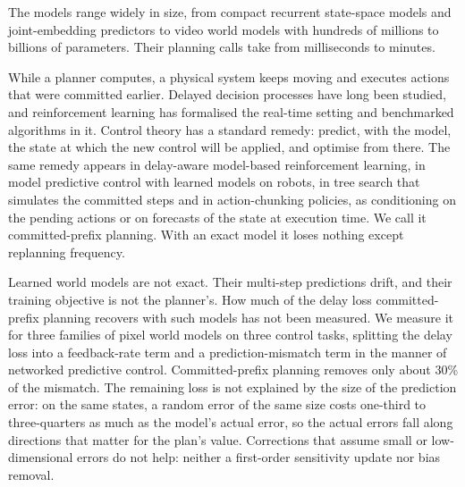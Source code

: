 \documentclass[pdflatex,sn-nature]{sn-jnl}%
\begin{document}
The models range widely in size, from compact recurrent state-space models\cite{hafner2019planet} and joint-embedding predictors\cite{maes2026lewm,zhou2024dinowm} to video world models with hundreds of millions to billions of parameters\cite{zhao2026miniworld,wu2024ivideogpt,alonso2024diamond,nvidia2025cosmos}. Their planning calls take from milliseconds to minutes.

While a planner computes, a physical system keeps moving and executes actions that were committed earlier. Delayed decision processes have long been studied\cite{katsikopoulos2003delays}, and reinforcement learning has formalised the real-time setting\cite{ramstedt2019rtrl,xiao2020thinking,ramstedt2020random,riemer2024staggered} and benchmarked algorithms in it\cite{thodoroff2022benchmarking}. Control theory has a standard remedy: predict, with the model, the state at which the new control will be applied, and optimise from there\cite{smith1957dead,findeisen2004computational,dirckx2024asap}. The same remedy appears in delay-aware model-based reinforcement learning\cite{chen2020dats,karamzade2025random}, in model predictive control with learned models on robots\cite{elasri2025rthcp}, in tree search that simulates the committed steps\cite{muppidi2026time} and in action-chunking policies\cite{zhao2023act,chi2023diffusionpolicy}, as conditioning on the pending actions or on forecasts of the state at execution time\cite{black2025rtc,shukor2025smolvla,wang2026rapac,motubrain2026wamrt,liao2025dadp,jiang2026futurertc,ye2026dreamzero}. We call it committed-prefix planning. With an exact model it loses nothing except replanning frequency\cite{findeisen2004computational}.

Learned world models are not exact. Their multi-step predictions drift\cite{janner2019mbpo}, and their training objective is not the planner's\cite{lambert2020objective}. How much of the delay loss committed-prefix planning recovers with such models has not been measured. We measure it for three families of pixel world models on three control tasks, splitting the delay loss into a feedback-rate term and a prediction-mismatch term in the manner of networked predictive control\cite{beger2025optimal}. Committed-prefix planning removes only about 30\% of the mismatch. The remaining loss is not explained by the size of the prediction error: on the same states, a random error of the same size costs one-third to three-quarters as much as the model's actual error, so the actual errors fall along directions that matter for the plan's value. Corrections that assume small or low-dimensional errors do not help: neither a first-order sensitivity update\cite{zavala2009asnmpc,belvedere2026feedback} nor bias removal.
\end{document}
